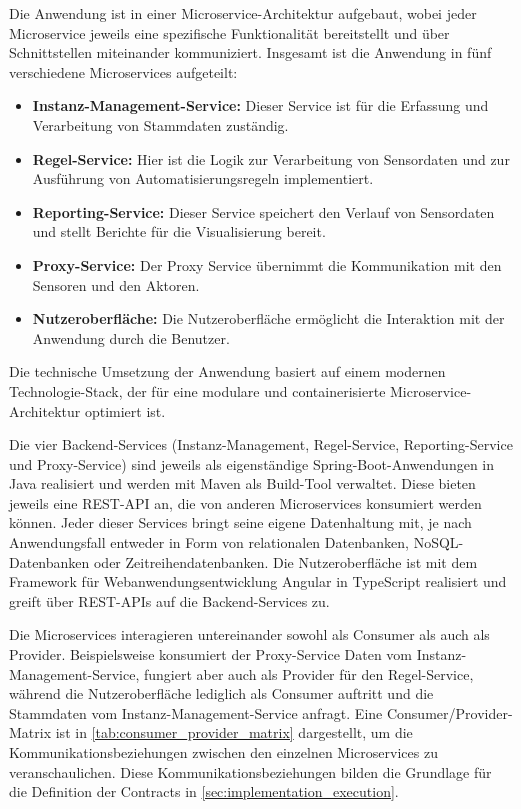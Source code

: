Die Anwendung ist in einer Microservice-Architektur aufgebaut, wobei jeder Microservice jeweils eine spezifische Funktionalität bereitstellt und über Schnittstellen miteinander kommuniziert.
Insgesamt ist die Anwendung in fünf verschiedene Microservices aufgeteilt:
\begin{itemize}
    \item \textbf{Instanz-Management-Service:} Dieser Service ist für die Erfassung und Verarbeitung von Stammdaten zuständig.
    \item \textbf{Regel-Service:} Hier ist die Logik zur Verarbeitung von Sensordaten und zur Ausführung von Automatisierungsregeln implementiert.
    \item \textbf{Reporting-Service:} Dieser Service speichert den Verlauf von Sensordaten und stellt Berichte für die Visualisierung bereit.
    \item \textbf{Proxy-Service:} Der Proxy Service übernimmt die Kommunikation mit den Sensoren und den Aktoren.
    \item \textbf{Nutzeroberfläche:} Die Nutzeroberfläche ermöglicht die Interaktion mit der Anwendung durch die Benutzer.
\end{itemize}

Die technische Umsetzung der Anwendung basiert auf einem modernen Technologie-Stack, der für eine modulare und containerisierte Microservice-Architektur optimiert ist.

Die vier Backend-Services (Instanz-Management, Regel-Service, Reporting-Service und Proxy-Service) sind jeweils als eigenständige \gls{Spring}-Boot-Anwendungen in Java realisiert und werden mit \gls{Maven} als \gls{Build}-Tool verwaltet.
Diese bieten jeweils eine \gls{REST}-\gls{API} an, die von anderen Microservices konsumiert werden können.
Jeder dieser Services bringt seine eigene Datenhaltung mit, je nach Anwendungsfall entweder in Form von relationalen Datenbanken, \gls{NoSQL}-Datenbanken oder Zeitreihendatenbanken.
Die Nutzeroberfläche ist mit dem Framework für Webanwendungsentwicklung \gls{Angular} in TypeScript realisiert und greift über \gls{REST}-\glspl{API} auf die Backend-Services zu.

Die Microservices interagieren untereinander sowohl als Consumer als auch als Provider.
Beispielsweise konsumiert der Proxy-Service Daten vom Instanz-Management-Service, fungiert aber auch als Provider für den Regel-Service, während die Nutzeroberfläche lediglich als Consumer auftritt und \zB die Stammdaten vom Instanz-Management-Service anfragt.
Eine Consumer/Provider-Matrix ist in \cref{tab:consumer_provider_matrix} dargestellt, um die Kommunikationsbeziehungen zwischen den einzelnen Microservices zu veranschaulichen.
Diese Kommunikationsbeziehungen bilden die Grundlage für die Definition der Contracts in \cref{sec:implementation_execution}.

